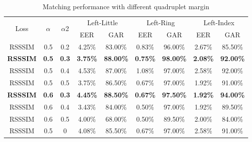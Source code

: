 \begin{table}[ht]
    \centering
    \caption{Matching performance with different quadruplet margin}
    \begin{tabular}{ccccccccc}
    \hline
    \multirow{2}{*}{Loss} & \multirow{2}{*}{$\alpha$} & \multirow{2}{*}{$\alpha$2} & \multicolumn{2}{c}{Left-Little}    & \multicolumn{2}{c}{Left-Ring}      & \multicolumn{2}{c}{Left-Index}     \\
                          &                         &                         & EER             & GAR              & EER             & GAR              & EER             & GAR              \\ \hline
    RSSSIM                & 0.5                     & 0.2                     & 4.25\%          & 83.00\%          & 0.83\%          & 96.00\%          & 2.67\%          & 85.50\%          \\
    \textbf{RSSSIM}       & \textbf{0.5}            & \textbf{0.3}            & \textbf{3.75\%} & \textbf{88.00\%} & \textbf{0.75\%} & \textbf{98.00\%} & \textbf{2.08\%} & \textbf{92.00\%} \\
    RSSSIM                & 0.5                     & 0.4                     & 4.53\%          & 87.00\%          & 1.08\%          & 97.00\%          & 2.58\%          & 92.00\%          \\
    RSSSIM                & 0.5                     & 0.5                     & 3.75\%          & 86.50\%          & 0.67\%          & 97.00\%          & 1.92\%          & 91.00\%          \\
    \textbf{RSSSIM}       & \textbf{0.6}            & \textbf{0.3}            & \textbf{4.45\%} & \textbf{88.50\%} & \textbf{0.67\%} & \textbf{97.50\%} & \textbf{1.92\%} & \textbf{94.00\%} \\
    RSSSIM                & 0.6                     & 0.4                     & 3.43\%          & 84.00\%          & 0.50\%          & 97.00\%          & 1.92\%          & 89.50\%          \\
    RSSSIM                & 0.6                     & 0.5                     & 4.00\%          & 68.00\%          & 0.50\%          & 89.50\%          & 2.00\%          & 84.00\%          \\
    RSSSIM                & 0.5                     & 0                       & 4.08\%          & 85.50\%          & 0.67\%          & 97.00\%          & 2.58\%          & 91.00\%          \\ \hline
    \end{tabular}
    \label{quadruplet}
\end{table}

